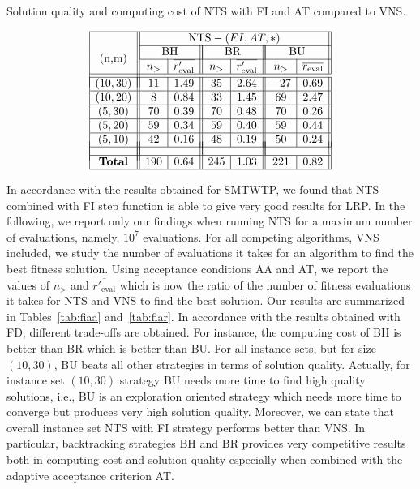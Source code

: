 \documentclass{acm_proc_article-sp}
\begin{document}
\begin{table}[htb!]
\caption{Solution quality and computing cost of NTS with FI and AT compared to VNS.}
\label{tab:fiar}
\vspace{-3ex}
$$
\begin{array}{|c||c|c||c|c||c|c||}
\hline
\multirow{4}{*}{(n,m)} &\multicolumn{6}{|c||}{\textrm{NTS}-(FI,AT,*)} \\
\cline{2-7}
& \multicolumn{2}{|c||}{\textrm{BH}} & \multicolumn{2}{|c||}{\textrm{BR}} & \multicolumn{2}{|c||}{\textrm{BU}} \\ \cline{2-7}


 & n_{>} & \overline{r'_{\textrm{eval}}} & n_{>} & \overline{r'_{\textrm{eval}}}  & n_{>} & \overline{r_{\textrm{eval}}} \\ 
 \cline{1-7}
 \\[-9 pt] 
\cline{1-7}

(10,30) & 11 & 1.49 & 35 & 2.64 & -27 & 0.69 \\ \hline
(10,20) & 8 & 0.84 & 33 & 1.45 & 69 & 2.47  \\ \hline
(5,30) & 70 & 0.39 & 70 & 0.48 & 70 & 0.26  \\ \hline
(5,20) & 59 & 0.34 & 59 & 0.40 & 59 & 0.44  \\ \hline
(5,10) & 42 & 0.16 & 48 & 0.19 & 50 & 0.24 \\ \hline\\[-17 pt]
& \multicolumn{2}{|c||}{ } & \multicolumn{2}{|c||}{ } & \multicolumn{2}{|c||}{ } \\ \hline
\textrm{\textbf{Total}} & 190 & 0.64 & 245 & 1.03 & 221 & 0.82 \\ \hline 
\end{array}
$$
\end{table}

In accordance with the results obtained for SMTWTP, we found that NTS combined with FI step function is able to give very good results for LRP. In the following, we report only our findings when running NTS for a maximum number of evaluations, namely, $10^7$ evaluations. For all competing algorithms, VNS included, we study the number of evaluations it takes for an algorithm to find the best fitness solution. Using acceptance conditions AA and AT, we report the values of $n_{>}$ and $\overline{r'_{\textrm{eval}}}$ which is now the ratio of the number of fitness evaluations it takes for NTS and VNS to find the best solution. Our results are summarized in Tables~\ref{tab:fiaa} and~\ref{tab:fiar}.
In accordance with the results obtained with FD, different trade-offs are obtained. For instance, the computing cost of BH is better than BR which is better than BU. For all instance sets, but for size $(10,30)$, BU beats all other strategies in terms of solution quality. Actually, for instance set $(10,30)$ strategy BU needs more time to find high quality solutions, i.e., BU is an exploration oriented strategy which needs more time to converge but produces very high solution quality. Moreover, we can state that overall instance set NTS with FI strategy performs better than VNS. In particular, backtracking strategies BH and BR provides very competitive results both in computing cost and solution quality especially when combined with the adaptive acceptance criterion AT.
\end{document}
